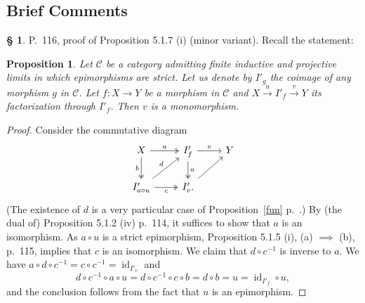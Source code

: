 \documentclass[12pt]{article}
\newtheorem{prop}[thm]{Proposition}
\theoremstyle{remark}
\theoremstyle{definition}
\newtheorem{s}[thm]{\S}
\newcommand{\C}{\mathcal C}
\newcommand{\xr}{\xrightarrow}
\newcommand{\mv}{ (minor variant)}
\DeclareMathOperator{\id}{id}
\begin{document}
\subsection{Brief Comments}
%
\begin{s} 
P.~116, proof of Proposition 5.1.7 (i)\mv. Recall the statement: 
%
\begin{prop} 
Let $\C$ be a category admitting finite inductive and projective limits in which epimorphisms are strict. Let us denote by $I'_g$ the coimage of any morphism $g$ in $\C$. Let $f:X\to Y$ be a morphism in $\C$ and $X\xr u I'_f\xr v Y$ its factorization through $I'_f$. Then $v$ is a monomorphism. 
\end{prop}
%
\begin{proof}
Consider the commutative diagram
$$
\begin{tikzcd}
X\ar[two heads]{d}[swap]{b}\ar[two heads]{r}{u}&I'_f\ar[two heads]{d}{a}\ar{r}{v}&Y\\
I'_{a\circ u}\ar{ur}{d}\ar[two heads]{r}[swap]{c}&I'_v.\ar{ru}
\end{tikzcd}
$$ 
(The existence of $d$ is a very particular case of Proposition~\ref{fun} p.~\pageref{fun}.) 
By (the dual of) Proposition 5.1.2 (iv) p.~114, it suffices to show that $a$ is an isomorphism. As $a\circ u$ is a strict epimorphism, Proposition 5.1.5 (i), (a) $\implies$ (b), p.~115, implies that $c$ is an isomorphism. We claim that $d\circ c^{-1}$ is inverse to $a$. We have $a\circ d\circ c^{-1}=c\circ c^{-1}=\id_{I'_v}$ and 
$$
d\circ c^{-1}\circ a\circ u=d\circ c^{-1}\circ c\circ b=d\circ b=u=\id_{I'_f}\circ u,
$$ 
and the conclusion follows from the fact that $u$ is an epimorphism.
\end{proof}
\end{s}
%
%
\end{document}
